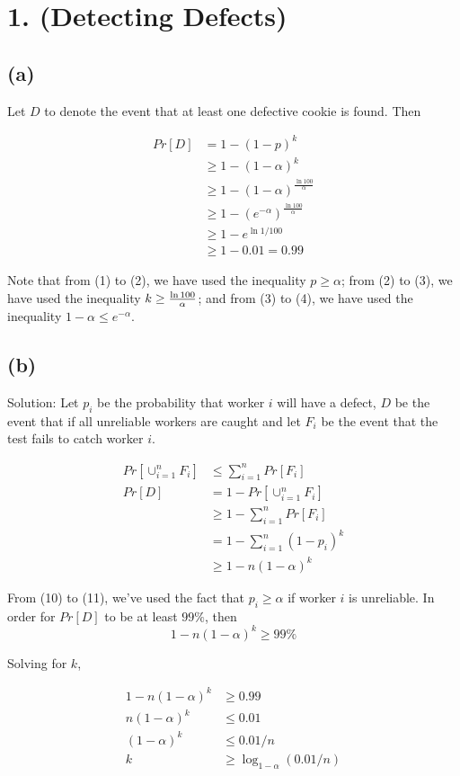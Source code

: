 \documentclass[10pt]{537homework}
\author{Peilun Dai}
\begin{document}
\section*{1. (Detecting Defects) }


\subsection*{(a)} \proof 

Let $D$ to denote the event that at least one defective cookie is found. Then 

\begin{align}
	Pr[D] 	& = 1 - (1-p)^k \\
			& \geq 1 - (1-\alpha)^k \\
			& \geq 1 - (1-\alpha)^{\frac{\ln{100}}{\alpha}} \\
			& \geq 1 - (e^{-\alpha})^{\frac{\ln{100}}{\alpha}} \\
			& \geq 1 - e^{\ln{1/100}} \\
			& \geq 1 - 0.01 = 0.99
\end{align}

Note that from (1) to (2), we have used the inequality $p \geq \alpha$; from (2) to (3), we have used the inequality $k \geq {\ln{100} \over \alpha}$; and from (3) to (4), we have used the inequality $1-\alpha \leq e^{-\alpha}$. 
  

\subsection*{(b)} Solution: Let $p_i$ be the probability that worker $i$ will have a defect, $D$ be the event that if all unreliable workers are caught and let $F_i$ be the event that the test fails to catch worker $i$. 

\begin{align}
  Pr[\cup_{i=1}^n F_i ] & \leq \sum_{i=1}^n Pr[F_i] \\
                  Pr[D] & = 1 - Pr[\cup_{i=1}^n F_i ] \\
                        & \geq 1 - \sum_{i=1}^n Pr[F_i] \\
                        & = 1 - \sum_{i=1}^n(1 - p_i)^k \\
                        & \geq 1 - n(1-\alpha)^k
\end{align}

From (10) to (11), we've used the fact that $p_i \geq \alpha$ if worker $i$ is unreliable. In order for $Pr[D]$ to be at least $99\%$, then 
$$
1 - n(1 - \alpha)^k \geq 99\%
$$

Solving for $k$, 

\begin{align}
  1 - n(1-\alpha)^k & \geq 0.99 \\
      n(1-\alpha)^k & \leq 0.01 \\
       (1-\alpha)^k & \leq 0.01/n \\
                  k & \geq \log_{1-\alpha}{(0.01/n)}
\end{align}
\end{document}
